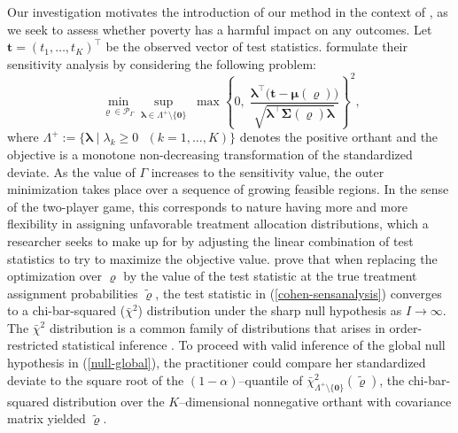 \documentclass[12pt,leqno,titlepage]{amsart}
\newcommand{\1}{\mathbbm{1}}
\begin{document}
\begin{bibunit}
Our investigation motivates the introduction of our method in the context of \cite{cohen2020multivariate}, as we seek to assess whether poverty has a harmful impact on any outcomes. Let $\mathbf{t} = (t_1, \ldots, t_K)^\top$ be the observed vector of test statistics. \cite{cohen2020multivariate} formulate their sensitivity analysis by considering the following problem:
\begin{equation} \label{cohen-sensanalysis}
\min_{\boldsymbol{\varrho} \in \mathcal{P}_{\Gamma}} 
\sup_{\boldsymbol{\lambda} \in \Lambda^+ \setminus\{\mathbf{0}\}} \; \max
\left \{
0,\;
\frac{\boldsymbol{\lambda}^\top\bigl(\mathbf{t} - \boldsymbol{\mu}(\boldsymbol{\varrho})\bigr) }
{ \sqrt{\boldsymbol{\lambda}^\top \boldsymbol{
\Sigma}(\boldsymbol{\varrho})\boldsymbol{\lambda}} }
\right \}^2,
\end{equation}
where $\Lambda^+ := \{\boldsymbol{\lambda} \mid \lambda_k \geq 0 \text{ } (k = 1,\ldots, K)\}$ denotes the positive orthant and the objective is a monotone non-decreasing transformation of the standardized deviate. As the value of $\Gamma$ increases to the sensitivity value, the outer minimization takes place over a sequence of growing feasible regions. In the sense of the two-player game, this corresponds to nature having more and more flexibility in assigning unfavorable treatment allocation distributions, which a researcher seeks to make up for by adjusting the linear combination of test statistics to try to maximize the objective value. \cite{cohen2020multivariate} prove that when replacing the optimization over $\boldsymbol{\varrho}$ by the value of the test statistic at the true treatment assignment probabilities $\tilde{\boldsymbol{\varrho}}$, the test statistic in (\ref{cohen-sensanalysis}) converges to a chi-bar-squared ($\bar{\chi}^2$) distribution under the sharp null hypothesis as $I \rightarrow \infty$. The $\bar{\chi}^2$ distribution is a common family of distributions that arises in order-restricted statistical inference \citep{silvapulle2011constrained}. To proceed with valid inference of the global null hypothesis in (\ref{null-global}), the practitioner could compare her standardized deviate to the square root of the $(1-\alpha)$--quantile of $\bar{\chi}^2_{\Lambda^+\setminus\{\mathbf{0}\}}(\tilde{\boldsymbol{\varrho}})$, the chi-bar-squared distribution over the $K$--dimensional nonnegative orthant with covariance matrix yielded $\tilde{\boldsymbol{\varrho}}$. 


\end{bibunit}
\end{document}
